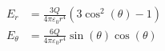 \documentclass{article}
\begin{document}
 
\addtocounter{equation}{0}
\begin{align}
    E_r &= \frac{3 Q}{4\pi\varepsilon_0 r^{4}} \left(3 \cos^{2}{\left (\theta \right )} - 1\right) \\
    E_\theta &= \frac{6 Q}{4\pi\varepsilon_0 r^{4}} \sin{\left (\theta \right )} \cos{\left (\theta \right )}
\end{align}
\end{document}
